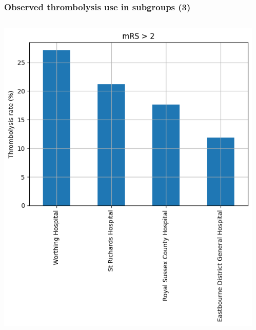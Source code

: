 \begin{frame}
\frametitle{Observed thrombolysis use in subgroups (3)}

  \begin{columns}[T]
    \begin{column}{0.5\textwidth}
      \includegraphics[width=1.0\textwidth]{./sussex/images/subgroup_disability}
    \end{column}
    \begin{column}{0.5\textwidth}

\end{column}
\end{columns}
\end{frame}
